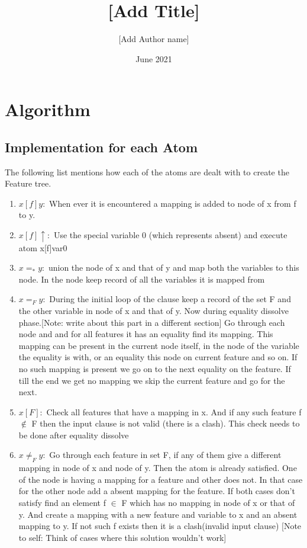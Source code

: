 \documentclass[12pt]{article}
\title{[Add Title]}
\author{[Add Author name]}
\date{June 2021}
\begin{document}
\maketitle

\section{Algorithm}
\subsection{Implementation for each Atom}
The following list mentions how each of the atoms are dealt with to create the Feature tree.
\begin{enumerate}
  \item $x[f]y :$ When ever it is encountered a mapping is added to node of x from f to y.
  
  \item $x[f]\uparrow : $ Use the special variable 0 (which represents absent) and execute atom x[f]var0
  
  \item $x=_* y : $  union the node of x and that of y and map both the variables to this node. In the node keep record of all the variables it is mapped from
  
  \item $x=_F y : $ During the initial loop of the clause keep a record of the set F and the other variable in node of x and that of y. Now during equality dissolve phase.[Note: write about this part in a different section] Go through each node and and for all features it has an equality find its mapping. This mapping can be present in the current node itself, in the node of the variable the equality is with, or an equality this node on current feature and so on. If no such mapping is present we go on to the next equality on the feature. If till the end we get no mapping we skip the current feature and go for the next.
  
  \item $x[F] : $ Check all features that have a mapping in x. And if any such feature f $\not\in$ F then the input clause is not valid (there is a clash). This check needs to be done after equality dissolve
  
  \item $x\neq_{F}y : $ Go through each feature in set F, if any of them give a different mapping in node of x and node of y. Then the atom is already satisfied. One of the node is having a mapping for a feature and other does not. In that case for the other node add a absent mapping for the feature. If both cases don't satisfy find an element f $\in$ F which has no mapping in node of x or that of y. And create a mapping with a new feature and variable to x and an absent mapping to y. If not such f exists then it is a clash(invalid input clause) [Note to self: Think of cases where this solution wouldn't work]
  

\end{enumerate}
\end{document}
